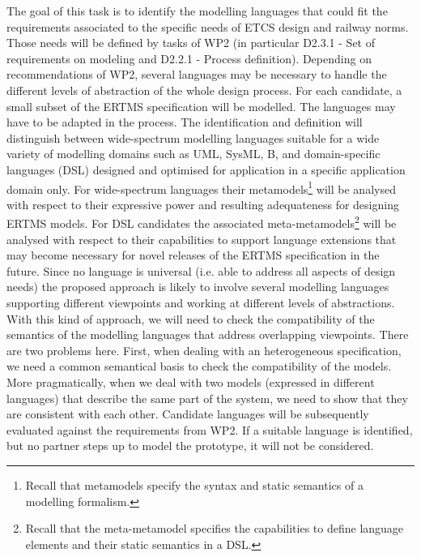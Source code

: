 \documentclass{template/openetcs_article}
\begin{document}
The goal of this task is to identify the modelling languages that
could fit the requirements associated to the specific needs of ETCS
design and railway norms. Those needs will be defined by tasks of WP2 
(in particular D2.3.1 - Set of requirements on modeling and 
D2.2.1 - Process definition). 
Depending on recommendations of WP2, several languages may
be necessary to handle the different levels of abstraction of the
whole design process.  For each candidate, a small subset of the ERTMS
specification will be modelled. The languages may have to be adapted
in the process. The identification and definition will distinguish
between wide-spectrum modelling languages suitable for a wide variety
of modelling domains such as UML, SysML, B, and domain-specific
languages (DSL) designed and optimised for application in a specific
application domain only.  For wide-spectrum languages their
metamodels\footnote{Recall that metamodels specify the syntax and
  static semantics of a modelling formalism.} will be analysed with
respect to their expressive power and resulting adequateness for
designing ERTMS models.  For DSL candidates the associated
meta-metamodels\footnote{Recall that the meta-metamodel specifies the
  capabilities to define language elements and their static semantics
  in a DSL.}  will be analysed with respect to their capabilities to
support language extensions that may become necessary for novel
releases of the ERTMS specification in the future.  Since no
language is universal (i.e. able to address all aspects of
design needs) the proposed approach is likely to involve several
modelling languages supporting different viewpoints and working at
different levels of abstractions. With this kind of approach, we will
need to check the compatibility of the semantics of the modelling
languages that address overlapping viewpoints. There are two problems
here. First, when dealing with an heterogeneous specification, we need
a common semantical basis to check the compatibility of the
models. More pragmatically, when we deal with two models (expressed in
different languages) that describe the same part of the system, we
need to show that they are consistent with each other. Candidate
languages will be subsequently evaluated against the requirements from
WP2.  If a suitable language is identified, but no partner steps up to
model the prototype, it will not be considered.

\end{document}
